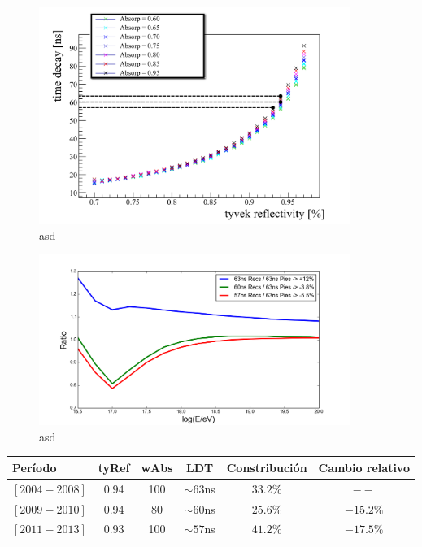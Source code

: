 	\begin{figure}[h!]
		\begin{center}
			\includegraphics[width=0.9\textwidth]{fig/resultadosAuger/timedecay_vs_reflect_absorp}
			\caption{asd}
			\label{fig:}
		\end{center}
	\end{figure}
	
	\begin{figure}[h!]
		\begin{center}
			\includegraphics[width=0.9\textwidth]{fig/resultadosAuger/exposure_Arrays}
			\caption{asd}
			\label{fig:}
		\end{center}
	\end{figure}
	
	\begin{table}[h!]
	\centering
	\renewcommand{\arraystretch}{1.4}
	 \begin{tabular}{l|ccc|c|c}
				Período       & tyRef & wAbs & LDT        & Constribución &   Cambio relativo \\
				\hline
				$[2004 - 2008]$ & 0.94  & 100  & $\sim63$ns & $33.2\%$     &   $--$ \\
				$[2009 - 2010]$ & 0.94  & 80   & $\sim60$ns & $25.6\%$     &   $-15.2\%$\\
				$[2011 - 2013]$ & 0.93  & 100  & $\sim57$ns & $41.2\%$     &   $-17.5\%$\\
			\end{tabular}
	\end{table}
	
